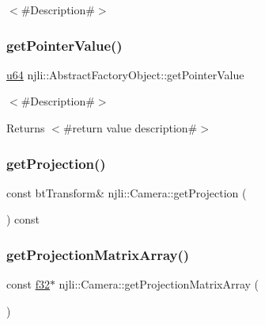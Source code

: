 $<$\#\+Description\#$>$ \mbox{\label{classnjli_1_1_camera_a4ffddf141a426a5a07d0ac19f1913811}} 
\subsubsection{\texorpdfstring{get\+Pointer\+Value()}{getPointerValue()}}
{\footnotesize\ttfamily \mbox{\hyperlink{_util_8h_ad758b7a5c3f18ed79d2fcd23d9f16357}{u64}} njli\+::\+Abstract\+Factory\+Object\+::get\+Pointer\+Value}

$<$\#\+Description\#$>$

\begin{DoxyReturn}{Returns}
$<$\#return value description\#$>$ 
\end{DoxyReturn}
\mbox{\label{classnjli_1_1_camera_a3c26254e5f1217ba465f37054e862bef}} 
\subsubsection{\texorpdfstring{get\+Projection()}{getProjection()}}
{\footnotesize\ttfamily const bt\+Transform\& njli\+::\+Camera\+::get\+Projection (\begin{DoxyParamCaption}{ }\end{DoxyParamCaption}) const\hspace{0.3cm}{\ttfamily [protected]}}

\mbox{\label{classnjli_1_1_camera_ad3ce75d9af1a7cc5468a371f211b51f4}} 
\subsubsection{\texorpdfstring{get\+Projection\+Matrix\+Array()}{getProjectionMatrixArray()}}
{\footnotesize\ttfamily const \mbox{\hyperlink{_util_8h_a5f6906312a689f27d70e9d086649d3fd}{f32}}$\ast$ njli\+::\+Camera\+::get\+Projection\+Matrix\+Array (\begin{DoxyParamCaption}{ }\end{DoxyParamCaption})\hspace{0.3cm}{\ttfamily [protected]}}

